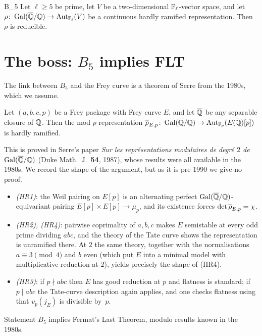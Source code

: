 \documentclass[11pt]{article}
\begin{document}
\begin{Bn}{B_5}
Let $\ell\geq5$ be prime, let $V$ be a two-dimensional $\mathbb{F}_\ell$-vector space,
and let $\rho\colon\operatorname{Gal}(\overline{\mathbb{Q}}/\mathbb{Q})\to\operatorname{Aut}_{\mathbb{F}_\ell}(V)$ be a continuous hardly ramified
representation. Then $\rho$ is reducible.
\end{Bn}

\section{The boss: $B_5$ implies FLT}

The link between $B_5$ and the Frey curve is a theorem of Serre from the
1980s, which we assume.

\begin{theorem}[Serre, 1987]\label{thm:frey-hr}
Let $(a,b,c,p)$ be a Frey package with Frey curve $E$, and let $\overline{\mathbb{Q}}$ be any
separable closure of $\mathbb{Q}$. Then the mod $p$ representation
$\overline{\rho}_{E,p}\colon\operatorname{Gal}(\overline{\mathbb{Q}}/\mathbb{Q})\to\operatorname{Aut}_{\mathbb{F}_p}(E(\overline{\mathbb{Q}})[p])$ is hardly ramified.
\end{theorem}

This is proved in Serre's paper \emph{Sur les repr\'esentations modulaires de
degr\'e $2$ de $\operatorname{Gal}(\overline{\mathbb{Q}}/\mathbb{Q})$} (Duke Math.\ J.\ \textbf{54}, 1987),
whose results were all available in the 1980s. We record the shape of the
argument, but as it is pre-1990 we give no proof.

\begin{itemize}
\item \emph{(HR1)}: the Weil pairing on $E[p]$ is an alternating perfect
$\operatorname{Gal}(\overline{\mathbb{Q}}/\mathbb{Q})$-equivariant pairing $E[p]\times E[p]\to\mu_p$, and its existence forces
$\det\overline{\rho}_{E,p}=\chi$.
\item \emph{(HR2), (HR4)}: pairwise coprimality of $a,b,c$ makes $E$ semistable
at every odd prime dividing $abc$, and the theory of the Tate curve shows the
representation is unramified there. At $2$ the same theory, together with the
normalisations $a\equiv3\pmod4$ and $b$ even (which put $E$ into a minimal
model with multiplicative reduction at $2$), yields precisely the shape of
\textup{(HR4)}.
\item \emph{(HR3)}: if $p\nmid abc$ then $E$ has good reduction at $p$ and
flatness is standard; if $p\mid abc$ the Tate-curve description again applies,
and one checks flatness using that $v_p(j_E)$ is divisible by~$p$.
\end{itemize}

\begin{theorem}\label{thm:boss5}
Statement $B_5$ implies Fermat's Last Theorem, modulo results known in the
1980s.
\end{theorem}
\end{document}
